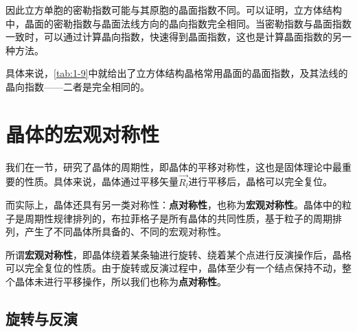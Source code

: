     因此立方单胞的密勒指数可能与其原胞的晶面指数不同。可以证明，立方体结构中，晶面的密勒指数与晶面法线方向的晶向指数完全相同。当密勒指数与晶面指数一致时，可以通过计算晶向指数，快速得到晶面指数，这也是计算晶面指数的另一种方法。
    
    具体来说，\autoref{tab:1-9}中就给出了立方体结构晶格常用晶面的晶面指数，及其法线的晶向指数——二者是完全相同的。

\section{晶体的宏观对称性}
    我们在一节，研究了晶体的周期性，即晶体的平移对称性，这也是固体理论中最重要的性质。具体来说，晶体通过平移矢量$\vec{R_l}$进行平移后，晶格可以完全复位。
    
    而实际上，晶体还具有另一类对称性：\textbf{点对称性}，也称为\textbf{宏观对称性}。晶体中的粒子是周期性规律排列的，布拉菲格子是所有晶体的共同性质，基于粒子的周期排列，产生了不同晶体所具备的、不同的宏观对称性。

    所谓\textbf{宏观对称性}，即晶体绕着某条轴进行旋转、绕着某个点进行反演操作后，晶格可以完全复位的性质。由于旋转或反演过程中，晶体至少有一个结点保持不动，整个晶体未进行平移操作，所以我们也称为\textbf{点对称性}。
    
\subsection{旋转与反演}
